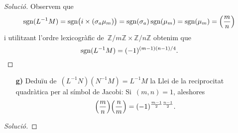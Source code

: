 \documentclass[a4paper]{article}
\newcommand{\ZZ}{\mathbb{Z}}
\DeclareMathOperator{\sgn}{sgn}
\newenvironment{solution}{
    \renewcommand\qedsymbol{\ensuremath{\lozenge}}
    \begin{proof}[Solució]
        }{
    \end{proof}
}
\begin{document}
\begin{solution}
    Observem que
    \[
        \sgn(L^{-1}M)
        =
        \sgn\bigl(i\times(\sigma_{a}\mu_{m})\bigr)
        =
        \sgn(\sigma_{a})\sgn(\mu_{m})
        =
        \sgn(\mu_{m})
        =
        \Bigl(\frac{m}{n}\Bigr)
    \]
    i utilitzant l'ordre lexicogràfic de~\(\ZZ/m\ZZ\times\ZZ/n\ZZ\) obtenim que
    \[
        \sgn(L^{-1}M)
        =
        (-1)^{(m-1)(n-1)/4}.
        \qedhere
    \]
\end{solution}

\begin{enumerate}
    \item[\textbf{g)}] Deduïu de~\((L^{-1}N)(N^{-1}M)=L^{-1}M\) la Llei de la
        reciprocitat quadràtica per al símbol de Jacobi:
        Si~\((m,n)=1\), aleshores
        \[
            \Bigl(\frac{m}{n}\Bigr)
            \Bigl(\frac{n}{m}\Bigr)
            =
            (-1)^{\frac{m-1}{2}\frac{n-1}{2}}.
        \]
\end{enumerate}

\begin{solution}
\end{solution}
\end{document}
